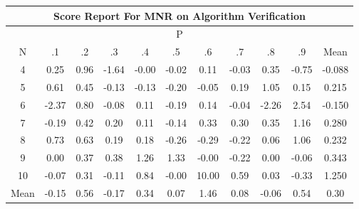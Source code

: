\documentclass[11pt,a4paper]{report}
\begin{document}
\begin{longtable}{ | c || c | c | c | c | c | c | c | c | c || c |}
\hline
\multicolumn{11}{|c|}{ Score Report For MNR on Algorithm Verification} \\
\hline
\multicolumn{11}{|c|}{ P } \\
\hline
N & .1 & .2 & .3 & .4 & .5 & .6 & .7 & .8 & .9 & Mean\\
 \hline
 \hline
 \endhead
  4 &  \cellcolor[HTML]{F7F7FF} 0.25 &  \cellcolor[HTML]{E7E7FF} 0.96 &  \cellcolor[HTML]{FFD7D7} -1.64 &  \cellcolor[HTML]{FFFFFF} -0.00 &  \cellcolor[HTML]{FFFFFF} -0.02 &  \cellcolor[HTML]{FFFFFF} 0.11 &  \cellcolor[HTML]{FFFFFF} -0.03 &  \cellcolor[HTML]{F7F7FF} 0.35 &  \cellcolor[HTML]{FFEFEF} -0.75 & -0.088 \\
  5 &  \cellcolor[HTML]{EFEFFF} 0.61 &  \cellcolor[HTML]{F7F7FF} 0.45 &  \cellcolor[HTML]{FFFFFF} -0.13 &  \cellcolor[HTML]{FFFFFF} -0.13 &  \cellcolor[HTML]{FFF7F7} -0.20 &  \cellcolor[HTML]{FFFFFF} -0.05 &  \cellcolor[HTML]{F7F7FF} 0.19 &  \cellcolor[HTML]{E7E7FF} 1.05 &  \cellcolor[HTML]{FFFFFF} 0.15 & 0.215 \\
  6 &  \cellcolor[HTML]{FFC7C7} -2.37 &  \cellcolor[HTML]{E7E7FF} 0.80 &  \cellcolor[HTML]{FFFFFF} -0.08 &  \cellcolor[HTML]{FFFFFF} 0.11 &  \cellcolor[HTML]{FFF7F7} -0.19 &  \cellcolor[HTML]{FFFFFF} 0.14 &  \cellcolor[HTML]{FFFFFF} -0.04 &  \cellcolor[HTML]{FFC7C7} -2.26 &  \cellcolor[HTML]{BFBFFF} 2.54 & -0.150 \\
  7 &  \cellcolor[HTML]{FFF7F7} -0.19 &  \cellcolor[HTML]{F7F7FF} 0.42 &  \cellcolor[HTML]{F7F7FF} 0.20 &  \cellcolor[HTML]{FFFFFF} 0.11 &  \cellcolor[HTML]{FFFFFF} -0.14 &  \cellcolor[HTML]{F7F7FF} 0.33 &  \cellcolor[HTML]{F7F7FF} 0.30 &  \cellcolor[HTML]{F7F7FF} 0.35 &  \cellcolor[HTML]{DFDFFF} 1.16 & 0.280 \\
  8 &  \cellcolor[HTML]{EFEFFF} 0.73 &  \cellcolor[HTML]{EFEFFF} 0.63 &  \cellcolor[HTML]{F7F7FF} 0.19 &  \cellcolor[HTML]{F7F7FF} 0.18 &  \cellcolor[HTML]{FFF7F7} -0.26 &  \cellcolor[HTML]{FFF7F7} -0.29 &  \cellcolor[HTML]{FFF7F7} -0.22 &  \cellcolor[HTML]{FFFFFF} 0.06 &  \cellcolor[HTML]{E7E7FF} 1.06 & 0.232 \\
  9 &  \cellcolor[HTML]{FFFFFF} 0.00 &  \cellcolor[HTML]{F7F7FF} 0.37 &  \cellcolor[HTML]{F7F7FF} 0.38 &  \cellcolor[HTML]{DFDFFF} 1.26 &  \cellcolor[HTML]{DFDFFF} 1.33 &  \cellcolor[HTML]{FFFFFF} -0.00 &  \cellcolor[HTML]{FFF7F7} -0.22 &  \cellcolor[HTML]{FFFFFF} 0.00 &  \cellcolor[HTML]{FFFFFF} -0.06 & 0.343 \\
  10 &  \cellcolor[HTML]{FFFFFF} -0.07 &  \cellcolor[HTML]{F7F7FF} 0.31 &  \cellcolor[HTML]{FFFFFF} -0.11 &  \cellcolor[HTML]{E7E7FF} 0.84 &  \cellcolor[HTML]{FFFFFF} -0.00 &  \cellcolor[HTML]{0808FF} 10.00 &  \cellcolor[HTML]{EFEFFF} 0.59 &  \cellcolor[HTML]{FFFFFF} 0.03 &  \cellcolor[HTML]{FFF7F7} -0.33 & 1.250 \\
 \hline
 \hline
Mean &  \cellcolor[HTML]{FFFFFF} -0.15 &  \cellcolor[HTML]{EFEFFF} 0.56 &  \cellcolor[HTML]{FFF7F7} -0.17 &  \cellcolor[HTML]{F7F7FF} 0.34 &  \cellcolor[HTML]{FFFFFF} 0.07 &  \cellcolor[HTML]{D7D7FF} 1.46 &  \cellcolor[HTML]{FFFFFF} 0.08 &  \cellcolor[HTML]{FFFFFF} -0.06 &  \cellcolor[HTML]{EFEFFF} 0.54 &  \cellcolor[HTML]{F7F7FF} 0.30
\end{longtable}
\end{document}
